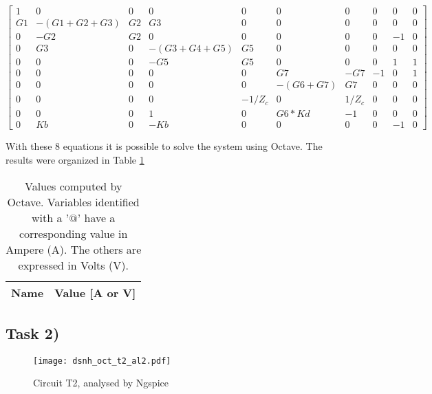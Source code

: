 $ \begin{bmatrix}
1 & 0 & 0 & 0 & 0 & 0 & 0 & 0 & 0 & 0 \\
G1 & -(G1+G2+G3) & G2 & G3 & 0 & 0 & 0 & 0 & 0 & 0 \\
0 & -G2 & G2 & 0 & 0 & 0 & 0 & 0 & -1 & 0 \\
0 & G3 & 0 & -(G3+G4+G5) & G5 & 0 & 0 & 0 & 0 & 0 \\
0 & 0 & 0 & -G5 & G5 & 0 & 0 & 0 & 1 & 1 \\
0 & 0 & 0 & 0 & 0 & G7 & -G7 & -1 & 0 & 1 \\
0 & 0 & 0 & 0 & 0 & -(G6+G7) & G7 & 0 & 0 & 0 \\
0 & 0 & 0 & 0 & -1/Z_c & 0 & 1/Z_c & 0 & 0 & 0 \\
0 & 0 & 0 & 1 & 0 & G6*Kd & -1 & 0 & 0 & 0 \\
0 & Kb & 0 & -Kb & 0 & 0 & 0 & 0 & -1 & 0 
\end{bmatrix}  $

With these 8 equations it is possible to solve the system using Octave.
The results were organized in Table \ref{tab:node}

\begin{table}[ht]
	\centering
	\begin{tabular}{|l|r|}
    		\hline    
    		{\bf Name} & {\bf Value [A or V]} \\ \hline
    		
  	\end{tabular}
  	\caption{Values computed by Octave. Variables identified with a '$@$' have a
  	corresponding value in Ampere (A). The others are expressed in Volts (V).}
 
\label{tab:node}
\end{table}

\subsection{Task 2)}
\label{subsec:task2_a}

\begin{figure}[ht]
	\centering
	\texttt{[image: dsnh\_oct\_t2\_al2.pdf]}
	\caption{Circuit T2, analysed by Ngspice}
\label{fig:Dsnh_sim_t2}
\end{figure}

